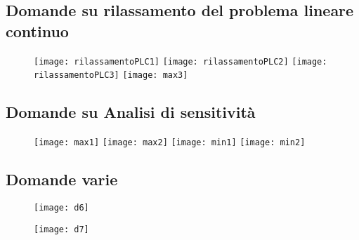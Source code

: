 \documentclass[\main/main.tex]{subfiles}
\begin{document}
\subsection{Domande su rilassamento del problema lineare continuo}
\begin{figure}
  \texttt{[image: rilassamentoPLC1]}
  \texttt{[image: rilassamentoPLC2]}
  \texttt{[image: rilassamentoPLC3]}
  \texttt{[image: max3]}
\end{figure}
\subsection{Domande su Analisi di sensitività}
\begin{figure}
  \texttt{[image: max1]}
  \texttt{[image: max2]}
  \texttt{[image: min1]}
  \texttt{[image: min2]}
\end{figure}
\subsection{Domande varie}
\begin{figure}
  \texttt{[image: d6]}
\end{figure}
\begin{figure}
  \texttt{[image: d7]}
\end{figure}
\end{document}
